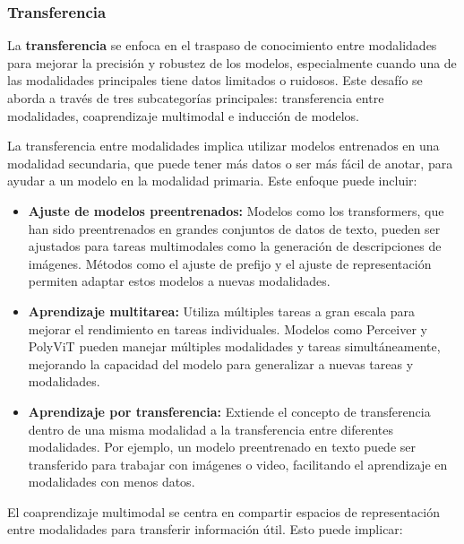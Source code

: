 \documentclass[../tesis.tex]{subfiles}
\begin{document}
\subsubsection{Transferencia}
La \textbf{transferencia} se enfoca en el traspaso de conocimiento entre modalidades para mejorar la precisión y robustez de los modelos, especialmente cuando una de las modalidades principales tiene datos limitados o ruidosos. Este desafío se aborda a través de tres subcategorías principales: transferencia entre modalidades, coaprendizaje multimodal e inducción de modelos.\par\null\par

La transferencia entre modalidades implica utilizar modelos entrenados en una modalidad secundaria, que puede tener más datos o ser más fácil de anotar, para ayudar a un modelo en la modalidad primaria. Este enfoque puede incluir:\par\null\par

\begin{itemize}
    \item \textbf{Ajuste de modelos preentrenados:} Modelos como los transformers, que han sido preentrenados en grandes conjuntos de datos de texto, pueden ser ajustados para tareas multimodales como la generación de descripciones de imágenes. Métodos como el ajuste de prefijo y el ajuste de representación permiten adaptar estos modelos a nuevas modalidades.
    \item \textbf{Aprendizaje multitarea:} Utiliza múltiples tareas a gran escala para mejorar el rendimiento en tareas individuales. Modelos como Perceiver y PolyViT pueden manejar múltiples modalidades y tareas simultáneamente, mejorando la capacidad del modelo para generalizar a nuevas tareas y modalidades.
    \item \textbf{Aprendizaje por transferencia:} Extiende el concepto de transferencia dentro de una misma modalidad a la transferencia entre diferentes modalidades. Por ejemplo, un modelo preentrenado en texto puede ser transferido para trabajar con imágenes o video, facilitando el aprendizaje en modalidades con menos datos.
\end{itemize}

El coaprendizaje multimodal se centra en compartir espacios de representación entre modalidades para transferir información útil. Esto puede implicar:\par\null\par
\end{document}
